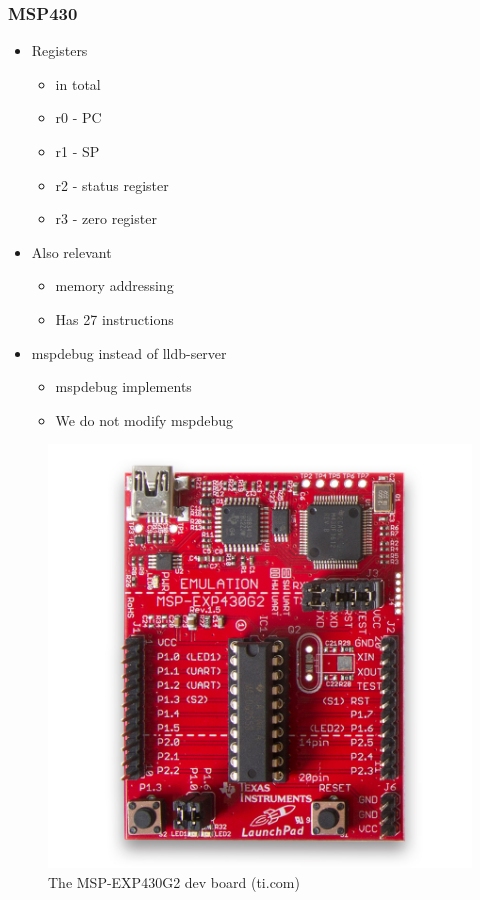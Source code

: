 \begin{frame}[fragile]
\frametitle{MSP430}
\begin{minipage}[t]{0.50\linewidth}
    \begin{itemize}
        \item Registers
        \begin{itemize}
            \item {} in total
            \item r0 - PC
            \item r1 - SP
            \item r2 - status register
            \item r3 - zero register
        \end{itemize}
        \item Also relevant
        \begin{itemize}
            \item {} memory addressing
            \item Has 27 instructions            
        \end{itemize}
        \item mspdebug instead of lldb-server
        \begin{itemize}
            \item mspdebug implements 
            \item We do not modify mspdebug
        \end{itemize}
    \end{itemize}
\end{minipage}
\begin{minipage}[t]{0.49\linewidth}
    \begin{figure}
        \includegraphics[scale=0.15]{launchpad-mspexp430g2.jpg}        
        \caption{The MSP-EXP430G2 dev board (ti.com)}
    \end{figure}
\end{minipage}
\end{frame}

